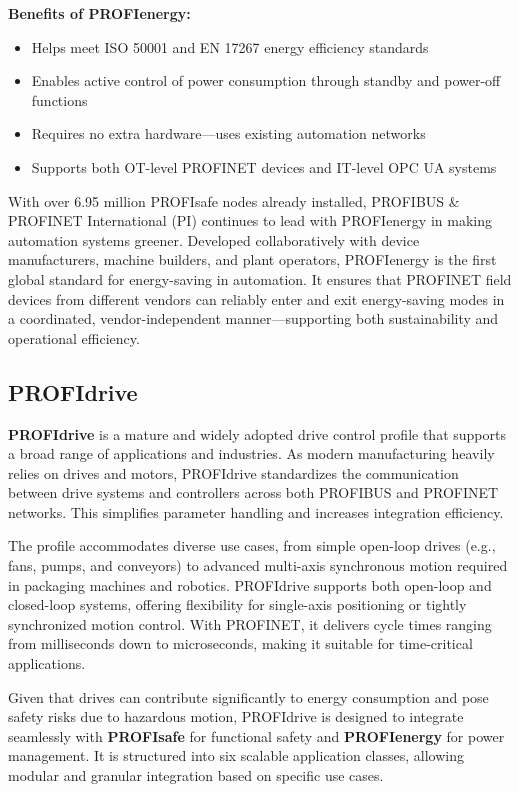 \documentclass[conference]{IEEEtran}
\begin{document}
\textbf{Benefits of PROFIenergy:}
\begin{itemize}
    \item Helps meet ISO 50001 and EN 17267 energy efficiency standards
    \item Enables active control of power consumption through standby and power-off functions
    \item Requires no extra hardware—uses existing automation networks
    \item Supports both OT-level PROFINET devices and IT-level OPC UA systems
\end{itemize}

With over 6.95 million PROFIsafe nodes already installed, PROFIBUS \& PROFINET International (PI) continues to lead with PROFIenergy in making automation systems greener. Developed collaboratively with device manufacturers, machine builders, and plant operators, PROFIenergy is the first global standard for energy-saving in automation. It ensures that PROFINET field devices from different vendors can reliably enter and exit energy-saving modes in a coordinated, vendor-independent manner—supporting both sustainability and operational efficiency.


\subsection{PROFIdrive}
\label{subsec: PROFIdrive}
\textbf{PROFIdrive} is a mature and widely adopted drive control profile that supports a broad range of applications and industries. As modern manufacturing heavily relies on drives and motors, PROFIdrive standardizes the communication between drive systems and controllers across both PROFIBUS and PROFINET networks. This simplifies parameter handling and increases integration efficiency.

The profile accommodates diverse use cases, from simple open-loop drives (e.g., fans, pumps, and conveyors) to advanced multi-axis synchronous motion required in packaging machines and robotics. PROFIdrive supports both open-loop and closed-loop systems, offering flexibility for single-axis positioning or tightly synchronized motion control. With PROFINET, it delivers cycle times ranging from milliseconds down to microseconds, making it suitable for time-critical applications.

Given that drives can contribute significantly to energy consumption and pose safety risks due to hazardous motion, PROFIdrive is designed to integrate seamlessly with \textbf{PROFIsafe} for functional safety and \textbf{PROFIenergy} for power management. It is structured into six scalable application classes, allowing modular and granular integration based on specific use cases.
\end{document}
